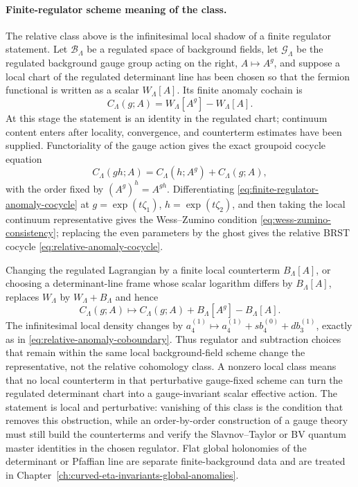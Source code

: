 \paragraph{Finite-regulator scheme meaning of the class.}
The relative class above is the infinitesimal local shadow of a finite
regulator statement.  Let \(\mathcal B_\Lambda\) be a regulated space of
background fields, let \(\mathcal G_\Lambda\) be the regulated background
gauge group acting on the right, \(A\mapsto A^g\), and suppose a local chart
of the regulated determinant line has been chosen so that the fermion
functional is written as a scalar \(W_\Lambda[A]\).  Its finite anomaly
cochain is
\begin{equation}
  C_\Lambda(g;A)
  =
  W_\Lambda[A^g]-W_\Lambda[A].
  \label{eq:finite-regulator-anomaly-cochain}
\end{equation}
At this stage the statement is an identity in the regulated chart; continuum
content enters after locality, convergence, and counterterm estimates have
been supplied.
Functoriality of the gauge action gives the exact groupoid cocycle equation
\begin{equation}
  C_\Lambda(gh;A)
  =
  C_\Lambda(h;A^g)+C_\Lambda(g;A),
  \label{eq:finite-regulator-anomaly-cocycle}
\end{equation}
with the order fixed by \((A^g)^h=A^{gh}\).  Differentiating
\eqref{eq:finite-regulator-anomaly-cocycle} at
\(g=\exp(t\zeta_1)\), \(h=\exp(t\zeta_2)\), and then taking the local
continuum representative gives the Wess--Zumino condition
\eqref{eq:wess-zumino-consistency}; replacing the even parameters by the
ghost gives the relative BRST cocycle
\eqref{eq:relative-anomaly-cocycle}.

Changing the regulated Lagrangian by a finite local counterterm
\(B_\Lambda[A]\), or choosing a determinant-line frame whose scalar logarithm
differs by \(B_\Lambda[A]\), replaces \(W_\Lambda\) by
\(W_\Lambda+B_\Lambda\) and hence
\begin{equation}
  C_\Lambda(g;A)
  \longmapsto
  C_\Lambda(g;A)+B_\Lambda[A^g]-B_\Lambda[A].
  \label{eq:finite-regulator-anomaly-coboundary}
\end{equation}
The infinitesimal local density changes by
\(a_4^{(1)}\mapsto a_4^{(1)}+s b_4^{(0)}+d b_3^{(1)}\), exactly as in
\eqref{eq:relative-anomaly-coboundary}.  Thus regulator and subtraction
choices that remain within the same local background-field scheme change the
representative, not the relative cohomology class.  A nonzero local class
means that no local counterterm in that perturbative gauge-fixed scheme can
turn the regulated determinant chart into a gauge-invariant scalar effective
action.  The statement is local and perturbative: vanishing of this class is
the condition that removes this obstruction, while an order-by-order
construction of a gauge theory must still build the counterterms and verify
the Slavnov--Taylor or BV quantum master identities in the chosen regulator.
Flat global holonomies of the determinant or Pfaffian line are separate
finite-background data and are treated in
Chapter~\ref{ch:curved-eta-invariants-global-anomalies}.


